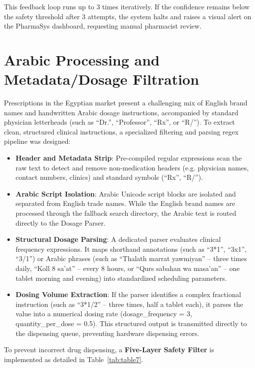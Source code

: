 \documentclass[12pt,a4paper,oneside]{report}
\begin{document}
This feedback loop runs up to 3 times iteratively. If the confidence
remains below the safety threshold after 3 attempts, the system halts
and raises a visual alert on the PharmaSys dashboard, requesting manual
pharmacist review.

\section{Arabic Processing and Metadata/Dosage
Filtration}\label{arabic-processing-and-metadatadosage-filtration}

Prescriptions in the Egyptian market present a challenging mix of
English brand names and handwritten Arabic dosage instructions,
accompanied by standard physician letterheads (such as ``Dr.'',
``Professor'', ``Rx'', or ``R/''). To extract clean, structured clinical
instructions, a specialized filtering and parsing regex pipeline was
designed:

\begin{itemize}
\item
  \textbf{Header and Metadata Strip}: Pre-compiled regular expressions
  scan the raw text to detect and remove non-medication headers (e.g.
  physician names, contact numbers, clinics) and standard symbols
  (``Rx'', ``R/'').
\item
  \textbf{Arabic Script Isolation}: Arabic Unicode script blocks are
  isolated and separated from English trade names. While the English
  brand names are processed through the fallback search directory, the
  Arabic text is routed directly to the Dosage Parser.
\item
  \textbf{Structural Dosage Parsing}: A dedicated parser evaluates
  clinical frequency expressions. It maps shorthand annotations (such
  as ``3*1'', ``3x1'', ``3/1'') or Arabic phrases (such as ``Thalath
  marrat yawmiyan'' -- three times daily, ``Koll 8 sa'at'' -- every 8
  hours, or ``Qurs sabahan wa masa'an'' -- one tablet morning and
  evening) into standardized scheduling parameters.
\item
  \textbf{Dosing Volume Extraction}: If the parser identifies a complex
  fractional instruction (such as ``3*1/2'' -- three times, half a
  tablet each), it parses the value into a numerical dosing rate
  (dosage\_frequency = 3, quantity\_per\_dose = 0.5). This structured
  output is transmitted directly to the dispensing queue, preventing
  hardware dispensing errors.
\end{itemize}

To prevent incorrect drug dispensing, a \textbf{Five-Layer Safety
Filter} is implemented as detailed in Table~\ref{tab:table7}.
\end{document}
